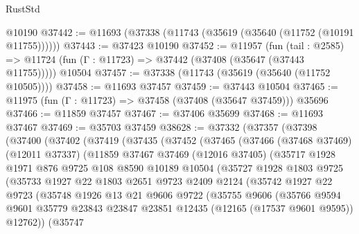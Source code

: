 \begin{lexlean}{RustStd}
\begin{coremodule}
    @10190
@37442 := @11693 (@37338 (@11743 (@35619 (@35640 (@11752 (@10191 @11755))))))
@37443 := @37423 @10190
@37452 := @11957
    (fun (tail : @2585) => @11724 (fun (Γ : @11723) => @37442 (@37408 (@35647 (@37443 @11755)))))
    @10504
@37457 := @37338 (@11743 (@35619 (@35640 (@11752 @10505))))
@37458 := @11693 @37457
@37459 := @37443 @10504
@37465 := @11975 (fun (Γ : @11723) => @37458 (@37408 (@35647 @37459))) @35696
@37466 := @11859 @37457
@37467 := @37406 @35699
@37468 := @11693 @37467
@37469 := @35703 @37459
@38628 := @37332
    (@37357
      (@37398
        (@37400
          (@37402
            (@37419
              (@37435
                (@37452
                  (@37465
                    (@37466
                      (@37468 @37469)
                      (@12011 @37337)
                      (@11859
                        @37467
                        @37469
                        (@12016 @37405)
                        (@35717
                          @1928
                          @1971
                          @876
                          @9725
                          @108
                          @8590
                          @10189
                          @10504
                          (@35727
                            @1928
                            @1803
                            @9725
                            (@35733
                              @1927
                              @22
                              @1803
                              @2651
                              @9723
                              @2409
                              @2124
                              (@35742
                                @1927
                                @22
                                @9723
                                (@35748
                                  @1926
                                  @13
                                  @21
                                  @9606
                                  @9722
                                  (@35755
                                    @9606
                                    (@35766
                                      @9594
                                      @9601
                                      @35779
                                      @23843
                                      @23847
                                      @23851
                                      @12435
                                      (@12165 (@17537 @9601 @9595))
                                      @12762))
                                  (@35747

\end{coremodule}
\end{lexlean}
